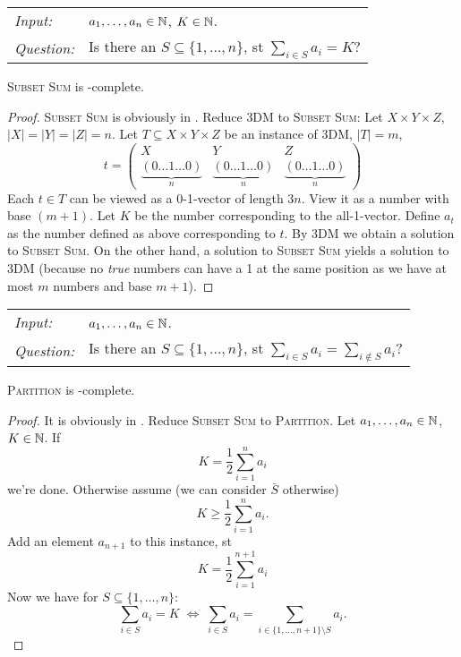 \documentclass[../skript.tex]{subfiles}
\begin{document}
\begin{problem}
\begin{tabular}{@{}ll}
\textit{Input:} & $a_1, \ldots, a_n \in \mathbb{N}$, $K \in \mathbb{N}$. \\
\textit{Question:} & Is there an $S \subseteq \{ 1, \ldots, n \}$, \ac{st} $\sum_{i \in S} a_i = K$?
\end{tabular}
\end{problem}
\begin{theorem} %
\label{thm:14}
\textsc{Subset Sum} is \NP-complete.
\end{theorem}
\begin{proof}
\textsc{Subset Sum} is obviously in \NP.
Reduce \textsc{3DM} to \textsc{Subset Sum}: Let $X \times Y \times Z$, $|X| = |Y| = |Z| = n$.
Let $T \subseteq X \times Y \times Z$ be an instance of \textsc{3DM}, $|T| = m$,
\[
	t = \begin{pmatrix}
	X & Y & Z \\
	\underbrace{(0 \ldots 1 \ldots 0)}_{n} & \underbrace{(0 \ldots 1 \ldots 0)}_{n} & \underbrace{(0 \ldots 1 \ldots 0)}_{n}
	\end{pmatrix}
\]
Each $t \in T$ can be viewed as a 0-1-vector of length $3n$.
View it as a number with base $(m + 1)$.
Let $K$ be the number corresponding to the all-1-vector. Define $a_t$ as the number defined as above corresponding to $t$.
By \textsc{3DM} we obtain a solution to \textsc{Subset Sum}.
On the other hand, a solution to \textsc{Subset Sum} yields a solution to \textsc{3DM} (because no \textit{true} numbers can have a 1 at the same position as we have at most $m$ numbers and base $m + 1$).
\end{proof}
\begin{problem}[Partition]
\begin{tabular}{@{}ll}
\textit{Input:} & $a_1, \ldots, a_n \in \mathbb{N}$. \\
\textit{Question:} & Is there an $S \subseteq \{ 1, \ldots, n \}$, \ac{st} $\sum_{i \in S} a_i = \sum_{i \notin S} a_i$?
\end{tabular}
\end{problem}
\begin{theorem} %
\label{thm:15}
\textsc{Partition} is \NP-complete.
\end{theorem}
\begin{proof}
It is obviously in \NP.
Reduce \textsc{Subset Sum} to \textsc{Partition}. Let $a_1, \ldots, a_n \in \mathbb{N}$, $K \in \mathbb{N}$.
If
\[
	K = \frac{1}{2} \sum_{i = 1}^n a_i
\]
we're done.
Otherwise assume (we can consider $\bar{S}$ otherwise)
\[
	K \geq \frac{1}{2} \sum_{i = 1}^n a_i.
\]
Add an element $a_{n+1}$ to this instance, \ac{st}
\[
	K = \frac{1}{2} \sum_{i = 1}^{n+1} a_i
\]
Now we have for $S \subseteq \{ 1, \ldots, n \}$:
\[
	\sum_{i \in S} a_i = K \; \Leftrightarrow \; \sum_{i \in S} a_i = \sum_{i \in \{ 1, \ldots, n + 1 \} \setminus S} a_i.
\]
\end{proof}
\end{document}
